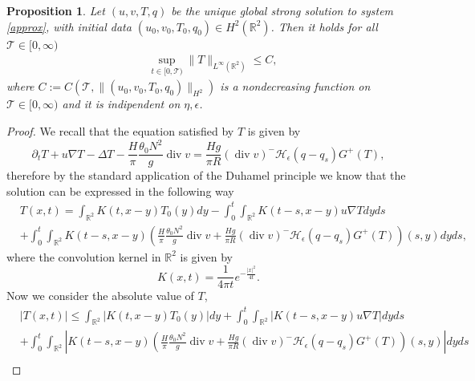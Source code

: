 \documentclass[11pt, a4paper, article,reqno,]{amsart}
\newtheorem{proposition}[theorem]{Proposition}
\theoremstyle{remark}
\DeclareMathOperator{\dive}{div}
\numberwithin{equation}{section}
\begin{document}
\begin{proposition}\label{max_princ}
 Let $(u,v,T,q)$ be the unique global strong solution to system \eqref{approx}, with initial data $(u_0,v_0,T_{0},q_0) \in H^2(\mathbb{R}^2)$. Then it holds for all $\mathcal{T} \in [0,\infty)$
    \begin{equation*}
    \begin{aligned}
        &  \sup_{t \in [0, \mathcal{T})}\|T\|_{L^\infty(\mathbb{R}^2)} \leq C,
    \end{aligned}
    \end{equation*}
    where $C:= C(\mathcal{T},\|(u_0,v_0,T_{0},q_0)\|_{H^2})$ is a nondecreasing function on $\mathcal{T} \in [0,\infty)$ and it is indipendent on $\eta,\epsilon$.
\end{proposition}
\begin{proof}
We recall that the equation satisfied by $T$ is given by
\begin{equation*}
    \partial_t T + u \nabla T - \Delta T - \frac{H}{\pi}\frac{\theta_0 N^2}{g}  \dive v = \frac{H g}{\pi R}(\dive v)^- \mathcal{H}_\epsilon(q-q_s) G^+(T),
\end{equation*}
therefore by the standard application of the Duhamel principle we know that the solution can be expressed in the following way
\begin{equation}
    \begin{aligned}
        & T(x,t)  = \int_{\mathbb{R}^2}K(t,x-y)T_0(y)dy - \int_0^t\!\!\int_{\mathbb{R}^2}\!\!K(t-s,x-y)u\nabla Tdyds\\
        & + \int_0^t\!\!\int_{\mathbb{R}^2}\!\!K(t-s,x-y)\left(\frac{H}{\pi}\frac{\theta_0 N^2}{g}  \dive v + \frac{H g}{\pi R}(\dive v)^-  \mathcal{H}_\epsilon(q-q_s) G^+(T) \right)(s,y)dyds,
    \end{aligned}
\end{equation}
where the convolution kernel in $\mathbb{R}^2$ is given by
\begin{equation*}
    K(x,t) = \frac{1}{4\pi t}e^{-\frac{|x|^2}{4t}}.
\end{equation*}
Now we consider the absolute value of $T$, 
\begin{equation*}
    \begin{aligned}
        & |T(x,t)|  \leq \int_{\mathbb{R}^2}|K(t,x-y)T_0(y)|dy +  \int_0^t\!\!\int_{\mathbb{R}^2}\left| K(t-s,x-y) u\nabla T \right|dyds\\
        & + \int_0^t\!\!\int_{\mathbb{R}^2}\left| K(t-s,x-y)\left( \frac{H}{\pi}\frac{\theta_0 N^2}{g}  \dive v + \frac{H g}{\pi R}(\dive v)^- \mathcal{H}_\epsilon(q-q_s) G^+(T) \right)(s,y)\right|dyds \\

\end{aligned}
\end{equation*}
\end{proof}
\end{document}
